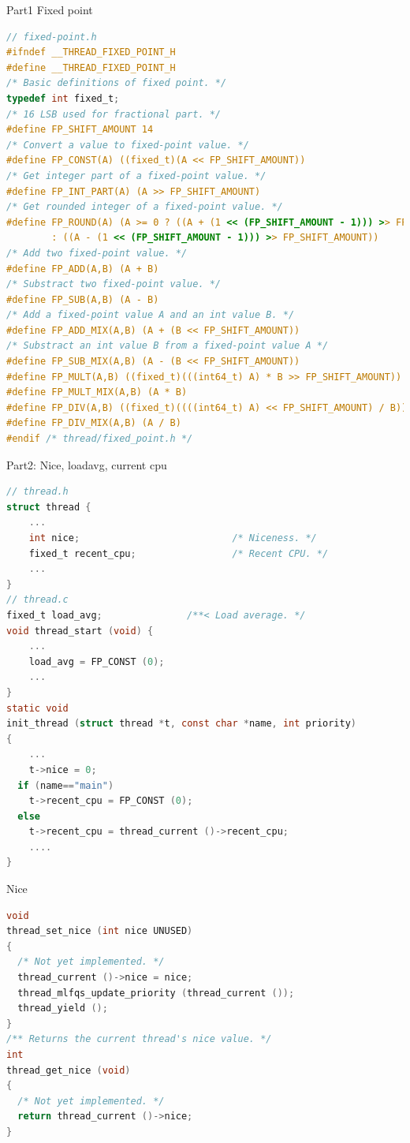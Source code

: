 \documentclass{beamer}
\begin{document}
\begin{frame}[fragile]{Part1 Fixed point}
\begin{lstlisting}[language=C]
// fixed-point.h
#ifndef __THREAD_FIXED_POINT_H
#define __THREAD_FIXED_POINT_H
/* Basic definitions of fixed point. */
typedef int fixed_t;
/* 16 LSB used for fractional part. */
#define FP_SHIFT_AMOUNT 14
/* Convert a value to fixed-point value. */
#define FP_CONST(A) ((fixed_t)(A << FP_SHIFT_AMOUNT))
/* Get integer part of a fixed-point value. */
#define FP_INT_PART(A) (A >> FP_SHIFT_AMOUNT)
/* Get rounded integer of a fixed-point value. */
#define FP_ROUND(A) (A >= 0 ? ((A + (1 << (FP_SHIFT_AMOUNT - 1))) >> FP_SHIFT_AMOUNT)\
        : ((A - (1 << (FP_SHIFT_AMOUNT - 1))) >> FP_SHIFT_AMOUNT))
/* Add two fixed-point value. */
#define FP_ADD(A,B) (A + B)
/* Substract two fixed-point value. */
#define FP_SUB(A,B) (A - B)
/* Add a fixed-point value A and an int value B. */
#define FP_ADD_MIX(A,B) (A + (B << FP_SHIFT_AMOUNT))
/* Substract an int value B from a fixed-point value A */
#define FP_SUB_MIX(A,B) (A - (B << FP_SHIFT_AMOUNT))
#define FP_MULT(A,B) ((fixed_t)(((int64_t) A) * B >> FP_SHIFT_AMOUNT))
#define FP_MULT_MIX(A,B) (A * B)
#define FP_DIV(A,B) ((fixed_t)((((int64_t) A) << FP_SHIFT_AMOUNT) / B))
#define FP_DIV_MIX(A,B) (A / B)
#endif /* thread/fixed_point.h */
\end{lstlisting}
\end{frame}
\begin{frame}[fragile]{Part2: Nice, loadavg, current cpu}
\begin{lstlisting}[language=C]
// thread.h
struct thread {
    ...
    int nice;                           /* Niceness. */
    fixed_t recent_cpu;                 /* Recent CPU. */
    ...
}
// thread.c
fixed_t load_avg;               /**< Load average. */
void thread_start (void) {
    ...
    load_avg = FP_CONST (0);
    ...
}
static void
init_thread (struct thread *t, const char *name, int priority)
{
    ...
    t->nice = 0;
  if (name=="main")
    t->recent_cpu = FP_CONST (0);
  else
    t->recent_cpu = thread_current ()->recent_cpu;
    ....
}
\end{lstlisting}
\end{frame}
\begin{frame}[fragile]{Nice}
\begin{lstlisting}[language=C]
void
thread_set_nice (int nice UNUSED) 
{
  /* Not yet implemented. */
  thread_current ()->nice = nice;
  thread_mlfqs_update_priority (thread_current ());
  thread_yield ();
}
/** Returns the current thread's nice value. */
int
thread_get_nice (void) 
{
  /* Not yet implemented. */
  return thread_current ()->nice;
}
\end{lstlisting}
\end{frame}
\end{document}
